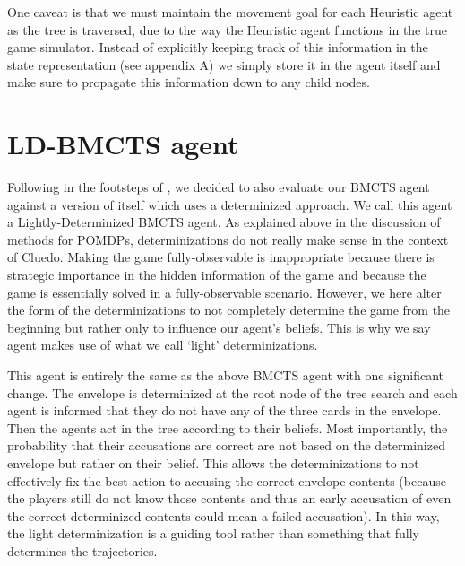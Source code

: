 \documentclass[msc, ai, twoside, notimes, logo, parskip, leftchapter, normalheadings]{infthesis}
\begin{document}
One caveat is that we must maintain the movement goal for each Heuristic agent as the tree is traversed, due to the way the Heuristic agent functions in the true game simulator. Instead of explicitly keeping track of this information in the state representation (see appendix A) we simply store it in the agent itself and make sure to propagate this information down to any child nodes.

\section{LD-BMCTS agent}
Following in the footsteps of \citep{Mihai}, we decided to also evaluate our BMCTS agent against a version of itself which uses a determinized approach. We call this agent a Lightly-Determinized BMCTS agent. As explained above in the discussion of methods for POMDPs, determinizations do not really make sense in the context of Cluedo. Making the game fully-observable is inappropriate because there is strategic importance in the hidden information of the game and because the game is essentially solved in a fully-observable scenario. However, we here alter the form of the determinizations to not completely determine the game from the beginning but rather only to influence our agent's beliefs. This is why we say agent makes use of what we call `light' determinizations.

This agent is entirely the same as the above BMCTS agent with one significant change. The envelope is determinized at the root node of the tree search and each agent is informed that they do not have any of the three cards in the envelope. Then the agents act in the tree according to their beliefs. Most importantly, the probability that their accusations are correct are not based on the determinized envelope but rather on their belief. This allows the determinizations to not effectively fix the best action to accusing the correct envelope contents (because the players still do not know those contents and thus an early accusation of even the correct determinized contents could mean a failed accusation). In this way, the light determinization is a guiding tool rather than something that fully determines the trajectories.
\end{document}
